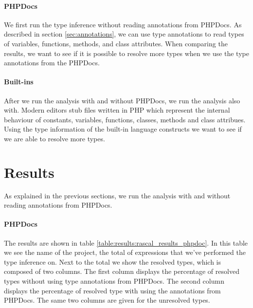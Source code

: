 \documentclass[../main.tex]{subfiles}
\begin{document}
	\paragraph{PHPDocs}
	We first run the type inference without reading annotations from PHPDocs.
	As described in section \ref{sec:annotations}, we can use type annotations to read types of variables, functions, methods, and class attributes.
	When comparing the results, we want to see if it is possible to resolve more types when we use the type annotations from the PHPDocs.
	
	\paragraph{Built-ins}
	After we run the analysis with and without PHPDocs, we run the analysis also with.
	Modern editors stub files written in PHP which represent the internal behaviour of constants, variables, functions, classes, methods and class attribues.
	Using the type information of the built-in language constructs we want to see if we are able to resolve more types.
			
	\section{Results}\label{sec:evaluation_results}
	
	As explained in the previous sections, we run the analysis with and without reading annotations from PHPDocs.
	
	\paragraph{PHPDocs}
	The results are shown in table \ref{table:results:rascal_results_phpdoc}.
	In this table we see the name of the project, the total of expressions that we've performed the type inference on.
	Next to the total we show the resolved types, which is composed of two columns.
	The first column displays the percentage of resolved types without using type annotations from PHPDocs.
	The second column displays the percentage of resolved type with using the annotations from PHPDocs.
	The same two columns are given for the unresolved types.
\end{document}
